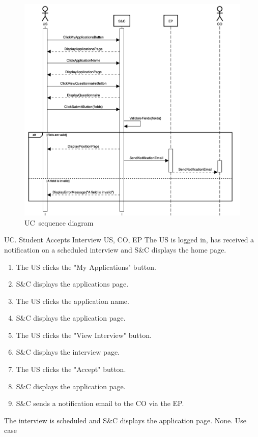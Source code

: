 \begin{figure}
    \centering
    \includegraphics[width=16cm]{images/sequence-diagrams/student-fills-out-questionnaire.png}
    \caption{UC\theuc\ sequence diagram}
\end{figure}


\clearpage

\begin{usecase}
    {UC\theuc. Student Accepts Interview}
    {US, CO, EP}
    {The US is logged in, has received a notification on a scheduled interview and S\&C displays the home page.}
    {\begin{enumerate}[leftmargin=*]
        \item The US clicks the "My Applications" button.
        \item S\&C displays the applications page.
        \item The US clicks the application name.
        \item S\&C displays the application page.
        \item The US clicks the "View Interview" button.
        \item S\&C displays the interview page.
        \item The US clicks the "Accept" button.
        \item S\&C displays the application page.
        \item S\&C sends a notification email to the CO via the EP.
    \end{enumerate}}
    {The interview is scheduled and S\&C displays the application page.}
    {None.}
    {Use case \theuc}
\end{usecase}

